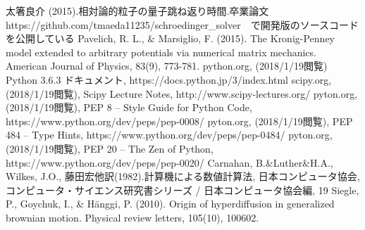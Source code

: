 \documentclass[a4paper, lualatex]{bxjsarticle}
\begin{document}
\begin{thebibliography}{30}
    太箸良介 (2015).相対論的粒子の量子跳ね返り時間.卒業論文
     https://github.com/tmaeda11235/schroedinger\_solver　で開発版のソースコードを公開している
    Pavelich, R. L., \& Marsiglio, F. (2015). The Kronig-Penney model extended to arbitrary potentials via numerical matrix mechanics. American Journal of Physics, 83(9), 773-781.
    python.org, (2018/1/19閲覧) Python 3.6.3 ドキュメント, https://docs.python.jp/3/index.html
    scipy.org, (2018/1/19閲覧), Scipy Lecture Notes, http://www.scipy-lectures.org/
    pyton.org, (2018/1/19閲覧), PEP 8 -- Style Guide for Python Code, https://www.python.org/dev/peps/pep-0008/
    pyton.org, (2018/1/19閲覧), PEP 484 -- Type Hints, https://www.python.org/dev/peps/pep-0484/
    pyton.org, (2018/1/19閲覧), PEP 20 -- The Zen of Python, https://www.python.org/dev/peps/pep-0020/
    Carnahan, B.\&Luther\&H.A., Wilkes, J.O., 藤田宏他訳(1982).計算機による数値計算法, 日本コンピュータ協会, コンピュータ・サイエンス研究書シリーズ / 日本コンピュータ協会編, 19
    Siegle, P., Goychuk, I., \& Hänggi, P. (2010). Origin of hyperdiffusion in generalized brownian motion. Physical review letters, 105(10), 100602.
\end{thebibliography}
\end{document}
